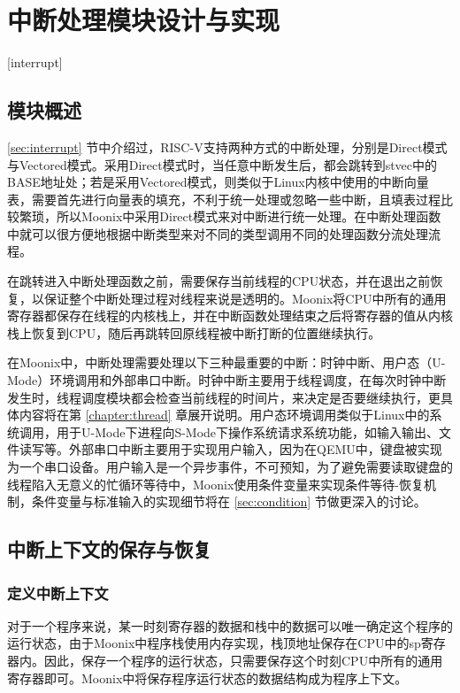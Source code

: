 
\chapter{中断处理模块设计与实现}[interrupt]
\label{chapter:interrupt}

\section{模块概述}

\ref{sec:interrupt} 节中介绍过，RISC-V支持两种方式的中断处理，分别是Direct模式与Vectored模式。采用Direct模式时，当任意中断发生后，都会跳转到stvec中的BASE地址处；若是采用Vectored模式，则类似于Linux内核中使用的中断向量表，需要首先进行向量表的填充，不利于统一处理或忽略一些中断，且填表过程比较繁琐，所以Moonix中采用Direct模式来对中断进行统一处理。在中断处理函数中就可以很方便地根据中断类型来对不同的类型调用不同的处理函数分流处理流程。

在跳转进入中断处理函数之前，需要保存当前线程的CPU状态，并在退出之前恢复，以保证整个中断处理过程对线程来说是透明的。Moonix将CPU中所有的通用寄存器都保存在线程的内核栈上，并在中断函数处理结束之后将寄存器的值从内核栈上恢复到CPU，随后再跳转回原线程被中断打断的位置继续执行。

在Moonix中，中断处理需要处理以下三种最重要的中断：时钟中断、用户态（U-Mode）环境调用和外部串口中断。时钟中断主要用于线程调度，在每次时钟中断发生时，线程调度模块都会检查当前线程的时间片，来决定是否要继续执行，更具体内容将在第 \ref{chapter:thread} 章展开说明。用户态环境调用类似于Linux中的系统调用，用于U-Mode下进程向S-Mode下操作系统请求系统功能，如输入输出、文件读写等。外部串口中断主要用于实现用户输入，因为在QEMU中，键盘被实现为一个串口设备。用户输入是一个异步事件，不可预知，为了避免需要读取键盘的线程陷入无意义的忙循环等待中，Moonix使用条件变量来实现条件等待-恢复机制，条件变量与标准输入的实现细节将在 \ref{sec:condition} 节做更深入的讨论。

\section{中断上下文的保存与恢复}

\subsection{定义中断上下文}

对于一个程序来说，某一时刻寄存器的数据和栈中的数据可以唯一确定这个程序的运行状态，由于Moonix中程序栈使用内存实现，栈顶地址保存在CPU中的sp寄存器内。因此，保存一个程序的运行状态，只需要保存这个时刻CPU中所有的通用寄存器即可。Moonix中将保存程序运行状态的数据结构成为程序上下文。

